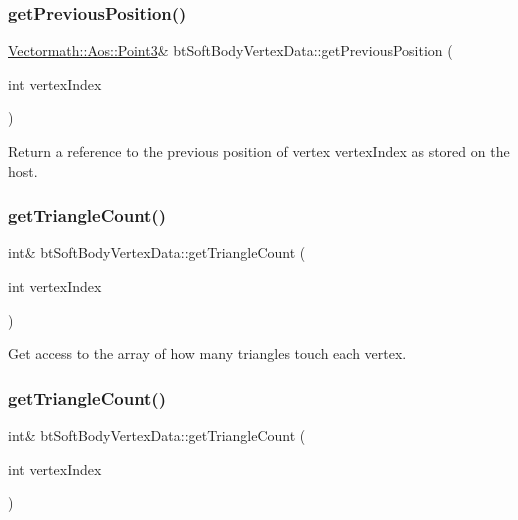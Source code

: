 \subsubsection{\texorpdfstring{get\+Previous\+Position()}{getPreviousPosition()}\hspace{0.1cm}{\footnotesize\ttfamily [2/2]}}
{\footnotesize\ttfamily \hyperlink{classVectormath_1_1Aos_1_1Point3}{Vectormath\+::\+Aos\+::\+Point3}\& bt\+Soft\+Body\+Vertex\+Data\+::get\+Previous\+Position (\begin{DoxyParamCaption}\item[{int}]{vertex\+Index }\end{DoxyParamCaption})\hspace{0.3cm}{\ttfamily [inline]}}

Return a reference to the previous position of vertex vertex\+Index as stored on the host. \mbox{\label{classbtSoftBodyVertexData_a8c4f3283367407c593745929aaf7d639}} 
\subsubsection{\texorpdfstring{get\+Triangle\+Count()}{getTriangleCount()}\hspace{0.1cm}{\footnotesize\ttfamily [1/2]}}
{\footnotesize\ttfamily int\& bt\+Soft\+Body\+Vertex\+Data\+::get\+Triangle\+Count (\begin{DoxyParamCaption}\item[{int}]{vertex\+Index }\end{DoxyParamCaption})\hspace{0.3cm}{\ttfamily [inline]}}

Get access to the array of how many triangles touch each vertex. \mbox{\label{classbtSoftBodyVertexData_a8c4f3283367407c593745929aaf7d639}} 
\subsubsection{\texorpdfstring{get\+Triangle\+Count()}{getTriangleCount()}\hspace{0.1cm}{\footnotesize\ttfamily [2/2]}}
{\footnotesize\ttfamily int\& bt\+Soft\+Body\+Vertex\+Data\+::get\+Triangle\+Count (\begin{DoxyParamCaption}\item[{int}]{vertex\+Index }\end{DoxyParamCaption})\hspace{0.3cm}{\ttfamily [inline]}}

